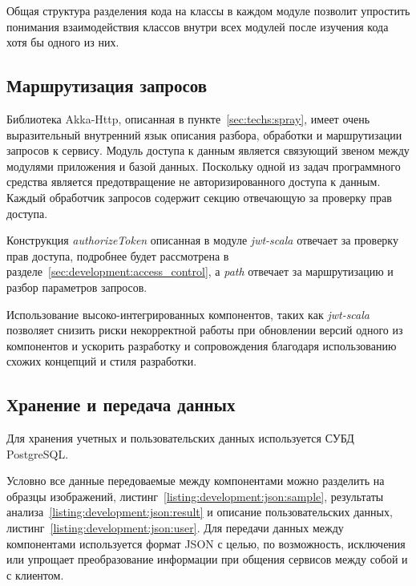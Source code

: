 Общая структура разделения кода на классы в каждом модуле позволит упростить понимания взаимодействия классов внутри всех модулей после изучения кода хотя бы одного из них.

\subsection{Маршрутизация запросов}
Библиотека Akka-Http, описанная в пункте~\ref{sec:techs:spray}, имеет очень выразительный внутренний язык описания разбора, обработки и маршрутизации запросов к сервису. Модуль доступа к данным является связующий звеном между модулями приложения и базой данных. Поскольку одной из задач программного средства является предотвращение не авторизированного доступа к данным. Каждый обработчик запросов содержит секцию отвечающую за проверку прав доступа.

Конструкция \emph{authorizeToken} описанная в модуле \emph{jwt-scala} отвечает за проверку прав доступа, подробнее будет рассмотрена в разделе~\ref{sec:development:access_control}, а \emph{path} отвечает за маршрутизацию и разбор параметров запросов. 

Использование высоко-интегрированных компонентов, таких как \emph{jwt-scala} позволяет снизить риски некорректной работы при обновлении версий одного из компонентов и ускорить разработку и сопровождения благодаря использованию схожих концепций и стиля разработки.

\subsection{Хранение и передача данных}
Для хранения учетных и пользовательских данных используется СУБД PostgreSQL.

Условно все данные передоваемые между компонентами можно разделить на образцы изображений, листинг~\ref{listing:development:json:sample}, результаты анализа~\ref{listing:development:json:result} и описание пользовательских данных, листинг~\ref{listing:development:json:user}. Для передачи данных между компонентами используется формат JSON с целью, по возможность, исключения или упрощает преобразование информации при общения сервисов между собой и с клиентом. 



